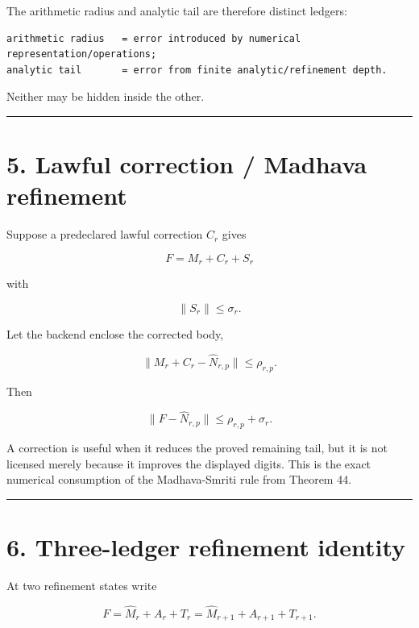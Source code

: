 The arithmetic radius and analytic tail are therefore distinct ledgers:

\begin{verbatim}
arithmetic radius   = error introduced by numerical representation/operations;
analytic tail       = error from finite analytic/refinement depth.
\end{verbatim}

Neither may be hidden inside the other.

\begin{center}\rule{0.5\linewidth}{0.5pt}\end{center}

\hypertarget{lawful-correction-madhava-refinement}{%
\section{5. Lawful correction / Madhava refinement}\label{lawful-correction-madhava-refinement}}

Suppose a predeclared lawful correction \(C_r\) gives

\[
\boxed{F=M_r+C_r+S_r}
\tag{5.1}
\]

with

\[
\|S_r\|\le\sigma_r.
\tag{5.2}
\]

Let the backend enclose the corrected body,

\[
\|M_r+C_r-\widehat N_{r,p}\|\le\rho_{r,p}.
\tag{5.3}
\]

Then

\[
\boxed{
\|F-\widehat N_{r,p}\|
\le
\rho_{r,p}+\sigma_r.
}
\tag{5.4}
\]

A correction is useful when it reduces the proved remaining tail, but it is not
licensed merely because it improves the displayed digits. This is the exact
numerical consumption of the Madhava-Smriti rule from Theorem 44.

\begin{center}\rule{0.5\linewidth}{0.5pt}\end{center}

\hypertarget{three-ledger-refinement-identity}{%
\section{6. Three-ledger refinement identity}\label{three-ledger-refinement-identity}}

At two refinement states write

\[
F=\widehat M_r+A_r+T_r
=\widehat M_{r+1}+A_{r+1}+T_{r+1}.
\tag{6.1}
\]


